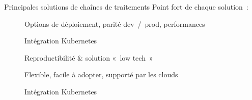 \begin{frame}{Principales solutions de chaînes de traitements}
  Point fort de chaque solution~:

  \begin{description}
    \item[] Options de déploiement, parité dev~/~prod, performances
    \item[] Intégration Kubernetes
    \item[] Reproductibilité \& solution «~low tech~»
    \item[] Flexible, facile à adopter, supporté par les clouds
    \item[] Intégration Kubernetes
  \end{description}
\end{frame}
